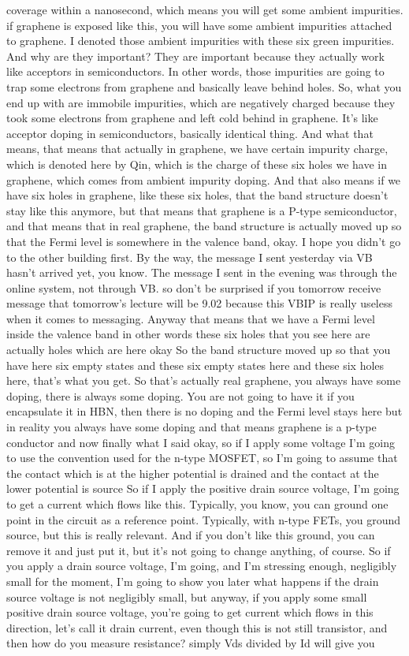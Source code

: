 coverage within a nanosecond, which means you will get some ambient impurities. if graphene is exposed like this, you will have some ambient impurities attached to graphene. I denoted those ambient impurities with these six green impurities. And why are they important? They are important because they actually work like acceptors in semiconductors. In other words, those impurities are going to trap some electrons from graphene and basically leave behind holes. So, what you end up with are immobile impurities, which are negatively charged because they took some electrons from graphene and left cold behind in graphene. It's like acceptor doping in semiconductors, basically identical thing. And what that means, that means that actually in graphene, we have certain impurity charge, which is denoted here by Qin, which is the charge of these six holes we have in graphene, which comes from ambient impurity doping. And that also means if we have six holes in graphene, like these six holes, that the band structure doesn't stay like this anymore, but that means that graphene is a P-type semiconductor, and that means that in real graphene, the band structure is actually moved up so that the Fermi level is somewhere in the valence band, okay. I hope you didn't go to the other building first. By the way, the message I sent yesterday via VB hasn't arrived yet, you know. The message I sent in the evening was through the online system, not through VB. so don't be surprised if you tomorrow receive message that tomorrow's lecture will be 9.02 because this VBIP is really useless when it comes to messaging. Anyway that means that we have a Fermi level inside the valence band in other words these six holes that you see here are actually holes which are here okay So the band structure moved up so that you have here six empty states and these six empty states here and these six holes here, that's what you get. So that's actually real graphene, you always have some doping, there is always some doping. You are not going to have it if you encapsulate it in HBN, then there is no doping and the Fermi level stays here but in reality you always have some doping and that means graphene is a p-type conductor and now finally what I said okay, so if I apply some voltage I'm going to use the convention used for the n-type MOSFET, so I'm going to assume that the contact which is at the higher potential is drained and the contact at the lower potential is source So if I apply the positive drain source voltage, I'm going to get a current which flows like this. Typically, you know, you can ground one point in the circuit as a reference point. Typically, with n-type FETs, you ground source, but this is really relevant. And if you don't like this ground, you can remove it and just put it, but it's not going to change anything, of course. So if you apply a drain source voltage, I'm going, and I'm stressing enough, negligibly small for the moment, I'm going to show you later what happens if the drain source voltage is not negligibly small, but anyway, if you apply some small positive drain source voltage, you're going to get current which flows in this direction, let's call it drain current, even though this is not still transistor, and then how do you measure resistance? simply Vds divided by Id will give you 